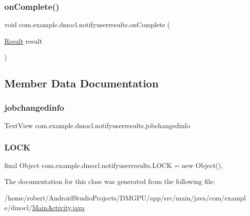\subsubsection{\texorpdfstring{on\+Complete()}{onComplete()}}
{\footnotesize\ttfamily void com.\+example.\+dmocl.\+notifyuserresults.\+on\+Complete (\begin{DoxyParamCaption}\item[{\mbox{\hyperlink{classcom_1_1example_1_1dmocl_1_1Result}{Result}}}]{result }\end{DoxyParamCaption})\hspace{0.3cm}{\ttfamily [inline]}}



\subsection{Member Data Documentation}
\mbox{\label{classcom_1_1example_1_1dmocl_1_1notifyuserresults_a4ac59e51f28a7d8cb31f91179272cb01}} 
\subsubsection{\texorpdfstring{jobchangedinfo}{jobchangedinfo}}
{\footnotesize\ttfamily Text\+View com.\+example.\+dmocl.\+notifyuserresults.\+jobchangedinfo\hspace{0.3cm}{\ttfamily [private]}}

\mbox{\label{classcom_1_1example_1_1dmocl_1_1notifyuserresults_ad3dd69907ddac2c0a0d2250a98d1e293}} 
\subsubsection{\texorpdfstring{L\+O\+CK}{LOCK}}
{\footnotesize\ttfamily final Object com.\+example.\+dmocl.\+notifyuserresults.\+L\+O\+CK = new Object()\hspace{0.3cm}{\ttfamily [static]}, {\ttfamily [private]}}



The documentation for this class was generated from the following file\+:\begin{DoxyCompactItemize}
\item 
/home/robert/\+Android\+Studio\+Projects/\+D\+M\+G\+P\+U/app/src/main/java/com/example/dmocl/\mbox{\hyperlink{MainActivity_8java}{Main\+Activity.\+java}}\end{DoxyCompactItemize}
